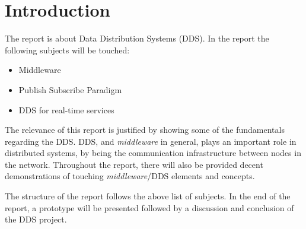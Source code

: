 \chapter{Introduction}

The report is about Data Distribution Systems (DDS). In the report the following subjects will be touched:

\begin{itemize}
\item Middleware
\item Publish Subscribe Paradigm
\item DDS for real-time services
\end{itemize}

The relevance of this report is justified by showing some of the fundamentals regarding the DDS.
DDS, and \emph{middleware} in general, plays an important role in distributed systems, by being the communication infrastructure between nodes in the network.
Throughout the report, there will also be provided decent demonstrations of touching \emph{middleware}/DDS elements and concepts.

The structure of the report follows the above list of subjects. In the end of the report, a prototype will be presented followed by a discussion and conclusion of the DDS project. 